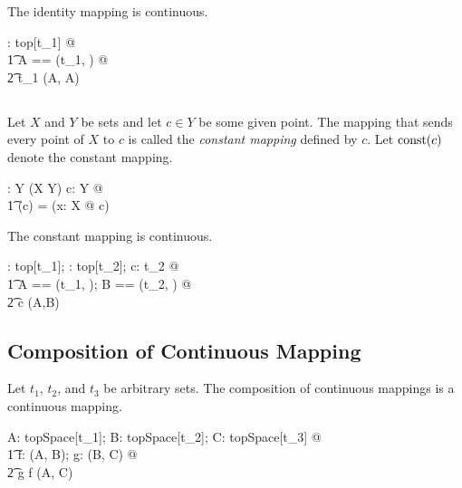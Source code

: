 \documentclass[11pt, oneside]{article}
\begin{document}
\begin{remark}
The identity mapping is continuous.

\begin{zed}
	\forall \tau: top[t_1] @ \\
	\t1	\LET A == (t_1, \tau) @ \\
	\t2		\id t_1 \in \CzeroTT(A, A)
\end{zed}

\end{remark}

\subsection{}

Let $X$ and $Y$ be sets and let $c \in Y$ be some given point.
The mapping that sends every point of $X$ to $c$ is called the {\it constant mapping} defined by $c$.
Let $\operatorname{const}(c)$ denote the constant mapping.

\begin{gendef}[X,Y]
	\const: Y \fun (X \fun Y)
\where
	\forall c: Y @ \\
	\t1	\const(c) = (\lambda x: X @ c)
\end{gendef}

\begin{remark}
The constant mapping is continuous.

\begin{zed}
	\forall \tau: top[t_1]; \sigma: top[t_2]; c: t_2 @ \\
	\t1	\LET A == (t_1, \tau); B == (t_2, \sigma) @ \\
	\t2		\const[t_1,t_2] c \in \CzeroTT(A,B)
\end{zed}

\end{remark}

\subsection{Composition of Continuous Mapping}

\begin{remark}
Let $t_1$, $t_2$, and $t_3$ be arbitrary sets.
The composition of continuous mappings is a continuous mapping.

\begin{zed}
	\forall A: topSpace[t_1]; B: topSpace[t_2]; C: topSpace[t_3] @ \\
	\t1	\forall f: \CzeroTT(A, B); g: \CzeroTT(B, C) @ \\
	\t2		g \circ f \in \CzeroTT(A, C)
\end{zed}

\end{remark}
\end{document}
